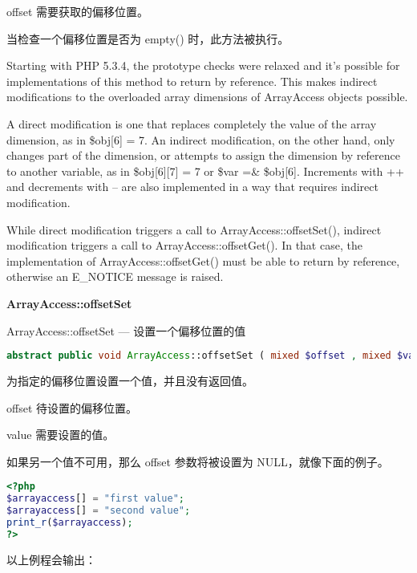 \begin{compactitem}
\item offset
需要获取的偏移位置。
\end{compactitem}

当检查一个偏移位置是否为 empty() 时，此方法被执行。


Starting with PHP 5.3.4, the prototype checks were relaxed and it's possible for implementations of this method to return by reference. This makes indirect modifications to the overloaded array dimensions of ArrayAccess objects possible.

A direct modification is one that replaces completely the value of the array dimension, as in \$obj[6] = 7. An indirect modification, on the other hand, only changes part of the dimension, or attempts to assign the dimension by reference to another variable, as in \$obj[6][7] = 7 or \$var =\& \$obj[6]. Increments with ++ and decrements with -- are also implemented in a way that requires indirect modification.

While direct modification triggers a call to ArrayAccess::offsetSet(), indirect modification triggers a call to ArrayAccess::offsetGet(). In that case, the implementation of ArrayAccess::offsetGet() must be able to return by reference, otherwise an E\_NOTICE message is raised.


\textbf{ArrayAccess::offsetSet}

ArrayAccess::offsetSet — 设置一个偏移位置的值


\begin{lstlisting}[language=PHP]
abstract public void ArrayAccess::offsetSet ( mixed $offset , mixed $value )
\end{lstlisting}

为指定的偏移位置设置一个值，并且没有返回值。


\begin{compactitem}
\item offset
待设置的偏移位置。
\item value
需要设置的值。
\end{compactitem}

如果另一个值不可用，那么 offset 参数将被设置为 NULL，就像下面的例子。

\begin{lstlisting}[language=PHP]
<?php
$arrayaccess[] = "first value";
$arrayaccess[] = "second value";
print_r($arrayaccess);
?>
\end{lstlisting}

以上例程会输出：

